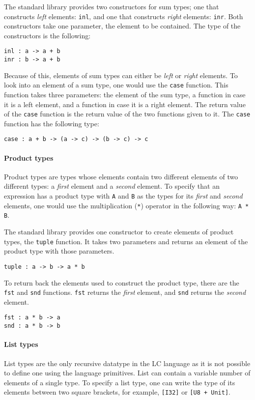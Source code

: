 \documentclass[12pt]{article}
\begin{document}
The standard library provides two constructors for sum types; one that
constructs \emph{left} elements: \verb$inl$, and one that constructs
\emph{right} elements: \verb$inr$. Both constructors take one parameter, the
element to be contained. The type of the constructors is the following:
\begin{lstlisting}
inl : a -> a + b
inr : b -> a + b
\end{lstlisting}
Because of this, elements of sum types can either be
\emph{left} or \emph{right} elements. To look into an element of a sum type, one
would use the \verb$case$ function. This function takes three parameters: the
element of the sum type, a function in case it is a left element, and a function
in case it is a right element. The return value of the \verb$case$ function is
the return value of the two functions given to it. The \verb$case$ function has
the following type:
\begin{lstlisting}
case : a + b -> (a -> c) -> (b -> c) -> c
\end{lstlisting}

\paragraph{Product types} Product types are types whose elements contain two
different elements of two different types: a \emph{first} element and a
\emph{second} element. To specify that an expression has a product type with
\verb$A$ and \verb$B$ as the types for its \emph{first} and \emph{second}
elements, one would use the multiplication (\verb$*$) operator in the following
way: \verb$A * B$.

The standard library provides one constructor to create elements of product
types, the \verb$tuple$ function. It takes two parameters and returns an element
of the product type with those parameters.
\begin{lstlisting}
tuple : a -> b -> a * b
\end{lstlisting}
To return back the elements used to construct the product type, there are the
\verb$fst$ and \verb$snd$ functions. \verb$fst$ returns the \emph{first}
element, and \verb$snd$ returns the \emph{second} element.
\begin{lstlisting}
fst : a * b -> a
snd : a * b -> b
\end{lstlisting}

\paragraph{List types} List types are the only recursive datatype in the LC
language as it is not possible to define one using the language primitives. List
can contain a variable number of elements of a single type. To specify a list
type, one can write the type of its elements between two square brackets, for
example, \verb$[I32]$ or \verb$[U8 + Unit]$.
\end{document}
